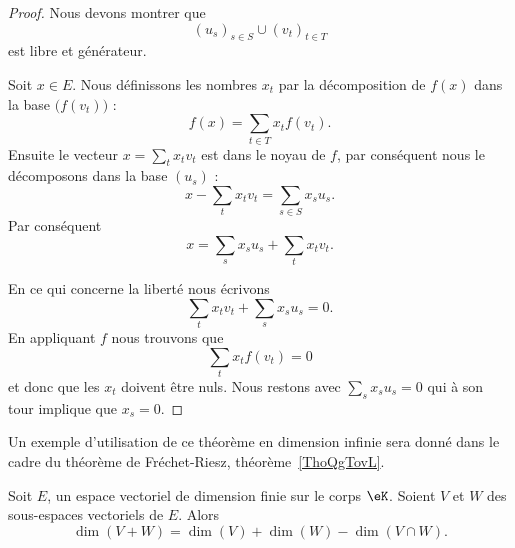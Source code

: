 \begin{proof}
	Nous devons montrer que
	\begin{equation}
		(u_s)_{s\in S}\cup (v_t)_{t\in T}
	\end{equation}
	est libre et générateur.

	Soit \( x\in E\). Nous définissons les nombres \( x_t\) par la décomposition de \( f(x)\) dans la base \( \big( f(v_t) \big)\) :
	\begin{equation}
		f(x)=\sum_{t\in T}x_tf(v_t).
	\end{equation}
	Ensuite le vecteur \( x=\sum_tx_tv_t\) est dans le noyau de \( f\), par conséquent nous le décomposons dans la base \( (u_s)\) :
	\begin{equation}
		x-\sum_tx_tv_t=\sum_{s\in S} x_su_s.
	\end{equation}
	Par conséquent
	\begin{equation}
		x=\sum_sx_su_s+\sum_tx_tv_t.
	\end{equation}

	En ce qui concerne la liberté nous écrivons
	\begin{equation}
		\sum_tx_tv_t+\sum_sx_su_s=0.
	\end{equation}
	En appliquant \( f\) nous trouvons que
	\begin{equation}
		\sum_tx_tf(v_t)=0
	\end{equation}
	et donc que les \( x_t\) doivent être nuls. Nous restons avec \( \sum_sx_su_s=0\) qui à son tour implique que \( x_s=0\).
\end{proof}
Un exemple d'utilisation de ce théorème en dimension infinie sera donné dans le cadre du théorème de Fréchet-Riesz, théorème~\ref{ThoQgTovL}.

\begin{proposition}      \label{PROPooQCIXooHIyPPq}
	Soit \( E\), un espace vectoriel de dimension finie sur le corps $\eK$. Soient \( V\) et \( W\) des sous-espaces vectoriels de \( E\). Alors
	\begin{equation}
		\dim(V+W)=\dim(V)+\dim(W)-\dim(V\cap W).
	\end{equation}
\end{proposition}

